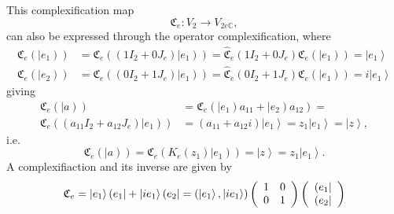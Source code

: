 \documentclass[aps,preprint]{revtex4}%
\begin{document}
This complexification map
\begin{equation}
\mathfrak{C}_{e}:V_{2}\rightarrow V_{2e\mathbb{C}},
\end{equation}
can also be expressed through the operator complexification, where%
\begin{align}
\mathfrak{C}_{e}\left(  \left\vert e_{1}\right)  \right)   &  =\mathfrak{C}%
_{e}\left(  \left(  1I_{2}+0J_{e}\right)  \left\vert e_{1}\right)  \right)
=\widehat{\mathfrak{C}}_{e}\left(  1I_{2}+0J_{e}\right)  \mathfrak{C}%
_{e}\left(  \left\vert e_{1}\right)  \right)  =\left\vert e_{1}\right\rangle
\\
\mathfrak{C}_{e}\left(  \left\vert e_{2}\right)  \right)   &  =\mathfrak{C}%
_{e}\left(  \left(  0I_{2}+1J_{e}\right)  \left\vert e_{1}\right)  \right)
=\widehat{\mathfrak{C}}_{e}\left(  0I_{2}+1J_{e}\right)  \mathfrak{C}%
_{e}\left(  \left\vert e_{1}\right)  \right)  =i\left\vert e_{1}\right\rangle
\end{align}
giving%
\begin{align}
\mathfrak{C}_{e}\left(  \left\vert a\right)  \right)   &  =\mathfrak{C}%
_{e}\left(  \left\vert e_{1}\right)  a_{11}+\left\vert e_{2}\right)
a_{12}\right)  =\\
\mathfrak{C}_{e}\left(  \left(  a_{11}I_{2}+a_{12}J_{e}\right)  \left\vert
e_{1}\right)  \right)   &  =\left(  a_{11}+a_{12}i\right)  \left\vert
e_{1}\right\rangle =z_{1}\left\vert e_{1}\right\rangle =\left\vert
z\right\rangle ,
\end{align}
i.e.
\begin{equation}
\mathfrak{C}_{e}\left(  \left\vert a\right)  \right)  =\mathfrak{C}_{e}\left(
K_{e}\left(  z_{1}\right)  \left\vert e_{1}\right)  \right)  =\left\vert
z\right\rangle =z_{1}\left\vert e_{1}\right\rangle .
\end{equation}
A complexifiaction and its inverse are given by
\begin{equation}
\mathfrak{C}_{e}=\left\vert e_{1}\right\rangle \left(  e_{1}\right\vert
+\left\vert ie_{1}\right\rangle \left(  e_{2}\right\vert =\left(  \left\vert
e_{1}\right\rangle ,\left\vert ie_{1}\right\rangle \right)  \left(
\begin{array}
[c]{cc}%
1 & 0\\
0 & 1
\end{array}
\right)  \left(
\begin{array}
[c]{c}%
\left(  e_{1}\right\vert \\
\left(  e_{2}\right\vert
\end{array}
\right)
\end{equation}
\end{document}
